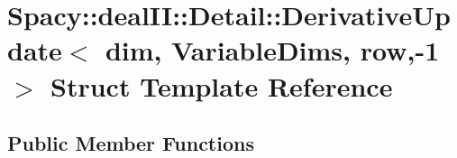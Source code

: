 \hypertarget{structSpacy_1_1dealII_1_1Detail_1_1DerivativeUpdate_3_01dim_00_01VariableDims_00_01row_00-1_01_4}{\section{Spacy\-:\-:deal\-I\-I\-:\-:Detail\-:\-:Derivative\-Update$<$ dim, Variable\-Dims, row,-\/1 $>$ Struct Template Reference}
\label{structSpacy_1_1dealII_1_1Detail_1_1DerivativeUpdate_3_01dim_00_01VariableDims_00_01row_00-1_01_4}
}
\subsection*{Public Member Functions}
